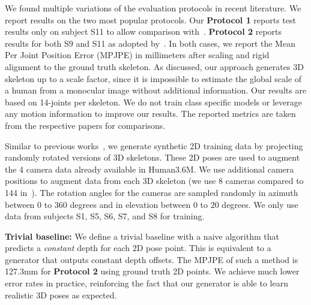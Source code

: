 \documentclass[runningheads]{llncs}
\begin{document}
We found multiple variations of the evaluation protocols in recent literature. We report results on the two most popular protocols. Our {\bf Protocol 1} reports test results only on subject S11 to allow comparison with~\cite{ChenDeva2017,Yasin_2016_CVPR}. {\bf Protocol 2} reports results for both S9 and S11 as adopted by~\cite{MartinezICCV2017,Zhou_2016_CVPR,tekin2016direct,Tung_2017_ICCV,li20143d}. In both cases, we report the Mean Per Joint Position Error (MPJPE) in millimeters after scaling and rigid alignment to the ground truth skeleton. As discussed, our approach generates 3D skeleton up to a scale factor, since it is impossible to estimate the global scale of a human from a monocular image without additional information. Our results are based on 14-joints per skeleton.
We do not train class specific models or leverage any motion information to improve our results. The reported metrics are taken from the respective papers for comparisons.


Similar to previous works~\cite{Tung_2017_ICCV,Yasin_2016_CVPR,li20143d}, we generate synthetic 2D training data by projecting randomly rotated versions of 3D skeletons. These 2D poses are used to augment the 4 camera data already available in Human3.6M. We use additional camera positions to augment data from each 3D skeleton (we use 8 cameras compared to 144 in~\cite{Yasin_2016_CVPR}). The rotation angles for the cameras are sampled randomly in azimuth between $0$ to $360$ degrees and in elevation between $0$ to $20$ degrees. We only use data from subjects S1, S5, S6, S7, and S8 for training. 

\textbf{Trivial baseline:} We define a trivial baseline with a naive algorithm that predicts a \textit{constant} depth for each 2D pose point. This is equivalent to a generator that outputs constant depth offsets. The MPJPE of such a method is 127.3mm for \textbf{Protocol 2} using ground truth 2D points. We achieve much lower error rates in practice, reinforcing the fact that our generator is able to learn realistic 3D poses as expected.
\end{document}
